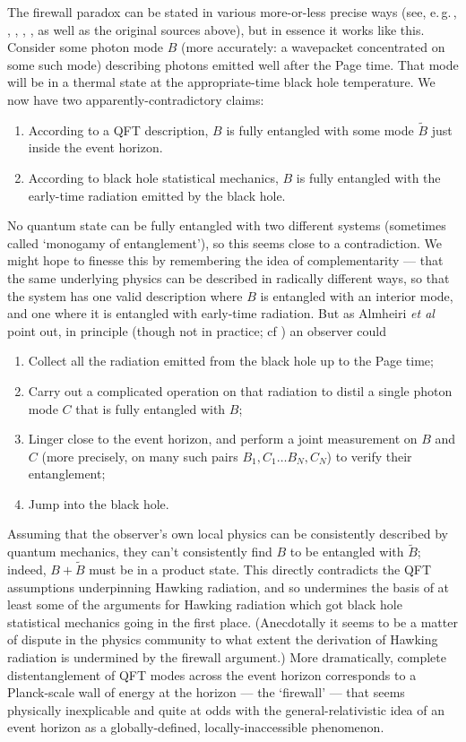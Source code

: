 \documentclass{article}
\newcommand{\egc}{\mbox{e.\,g.\,}}
\begin{document}
The firewall paradox can be stated in various more-or-less precise ways (see, \egc, , , , ,  as well as the original sources above), but in essence it works like this. Consider some photon mode $B$ (more accurately: a wavepacket concentrated on some such mode) describing photons emitted well after the Page time. That mode will be in a thermal state at the appropriate-time black hole temperature. We now have two apparently-contradictory claims:
\begin{enumerate}
\item According to a QFT description, $B$ is fully entangled with some mode $\tilde B$ just inside the event horizon.
\item According to black hole statistical mechanics, $B$ is fully entangled with the early-time radiation emitted by the black hole.
\end{enumerate}
No quantum state can be fully entangled with two different systems (sometimes called `monogamy of entanglement'), so this seems close to a contradiction. We might hope to finesse this by remembering the idea of complementarity --- that the same underlying physics can be described in radically different ways, so that the system has one valid description where $B$ is entangled with an interior mode, and one where it is entangled with early-time radiation. But as Almheiri \emph{et al} point out, in principle (though not in practice; cf ) an observer could
\begin{enumerate}
\item Collect all the radiation emitted from the black hole up to the Page time;
\item Carry out a complicated operation on that radiation to distil a single photon mode $C$ that is fully entangled with $B$;
\item Linger close to the event horizon, and perform a joint measurement on $B$ and $C$ (more precisely, on many such pairs $B_1,C_1 \ldots B_N,C_N$) to verify their entanglement;
\item Jump into the black hole.
\end{enumerate}
Assuming that the observer's own local physics can be consistently described by quantum mechanics, they can't consistently find $B$ to be entangled with $\tilde B$; indeed, $B+\tilde B$ must be in a product state. This directly contradicts the QFT assumptions underpinning Hawking radiation, and so undermines the basis of at least some of the arguments for Hawking radiation which got black hole statistical mechanics going in the first place. (Anecdotally it seems to be a matter of dispute in the physics community to what extent the derivation of Hawking radiation is undermined by the firewall argument.) More dramatically, complete distentanglement of QFT modes across the event horizon corresponds to a Planck-scale wall of energy at the horizon --- the `firewall' --- that seems physically inexplicable and quite at odds with the general-relativistic idea of an event horizon as a globally-defined, locally-inaccessible phenomenon. 
\end{document}
